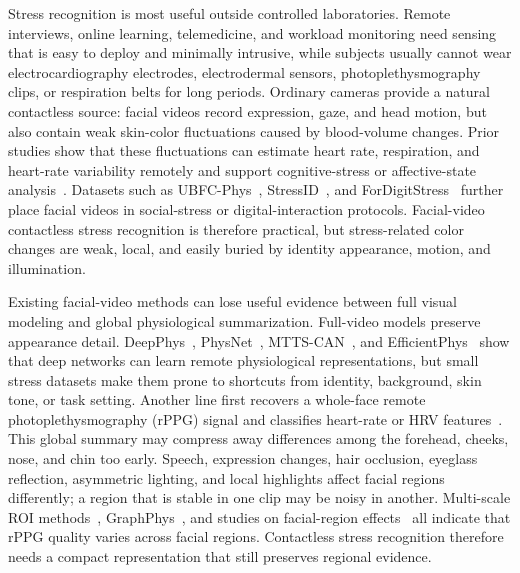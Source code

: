 \documentclass[runningheads]{llncs}
\begin{document}
Stress recognition is most useful outside controlled laboratories. Remote interviews, online learning, telemedicine, and workload monitoring need sensing that is easy to deploy and minimally intrusive, while subjects usually cannot wear electrocardiography electrodes, electrodermal sensors, photoplethysmography clips, or respiration belts for long periods. Ordinary cameras provide a natural contactless source: facial videos record expression, gaze, and head motion, but also contain weak skin-color fluctuations caused by blood-volume changes. Prior studies show that these fluctuations can estimate heart rate, respiration, and heart-rate variability remotely and support cognitive-stress or affective-state analysis~\cite{mcduff2014remote,benezeth2018remotehrv,nikolaiev2020noncontact}. Datasets such as UBFC-Phys~\cite{sabour2021ubfcphys}, StressID~\cite{chaptoukaev2023stressid}, and ForDigitStress~\cite{heimerl2024fordigitstress} further place facial videos in social-stress or digital-interaction protocols. Facial-video contactless stress recognition is therefore practical, but stress-related color changes are weak, local, and easily buried by identity appearance, motion, and illumination.

Existing facial-video methods can lose useful evidence between full visual modeling and global physiological summarization. Full-video models preserve appearance detail. DeepPhys~\cite{chen2018deepphys}, PhysNet~\cite{yu2019physnet}, MTTS-CAN~\cite{liu2020mttscan}, and EfficientPhys~\cite{liu2023efficientphys} show that deep networks can learn remote physiological representations, but small stress datasets make them prone to shortcuts from identity, background, skin tone, or task setting. Another line first recovers a whole-face remote photoplethysmography (rPPG) signal and classifies heart-rate or HRV features~\cite{mcduff2014remote,nikolaiev2020noncontact}. This global summary may compress away differences among the forehead, cheeks, nose, and chin too early. Speech, expression changes, hair occlusion, eyeglass reflection, asymmetric lighting, and local highlights affect facial regions differently; a region that is stable in one clip may be noisy in another. Multi-scale ROI methods~\cite{zhao2020multiscale}, GraphPhys~\cite{xiong2023graphphys}, and studies on facial-region effects~\cite{bondarenko2025regions} all indicate that rPPG quality varies across facial regions. Contactless stress recognition therefore needs a compact representation that still preserves regional evidence.
\end{document}
